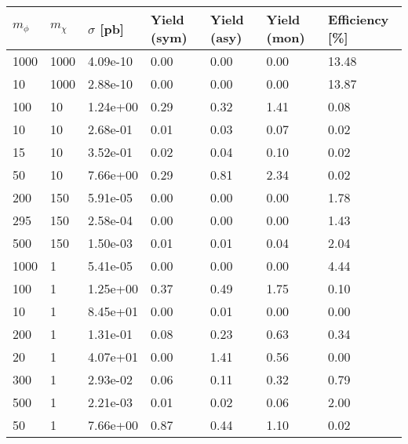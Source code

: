 \begin{table}
\small
\centering
\begin{tabular}{lllllll}
\hline
$m_\phi$ & $m_\chi$ & $\sigma$ [pb] & Yield (sym) & Yield (asy) & Yield (mon) & Efficiency [\%] \\ \hline
1000      &   1000      &   4.09e-10  &   0.00      &   0.00      &   0.00      &   13.48     \\ 
10        &   1000      &   2.88e-10  &   0.00      &   0.00      &   0.00      &   13.87     \\ 
100       &   10        &   1.24e+00  &   0.29      &   0.32      &   1.41      &   0.08      \\ 
10        &   10        &   2.68e-01  &   0.01      &   0.03      &   0.07      &   0.02      \\ 
15        &   10        &   3.52e-01  &   0.02      &   0.04      &   0.10      &   0.02      \\ 
50        &   10        &   7.66e+00  &   0.29      &   0.81      &   2.34      &   0.02      \\ 
200       &   150       &   5.91e-05  &   0.00      &   0.00      &   0.00      &   1.78      \\ 
295       &   150       &   2.58e-04  &   0.00      &   0.00      &   0.00      &   1.43      \\ 
500       &   150       &   1.50e-03  &   0.01      &   0.01      &   0.04      &   2.04      \\ 
1000      &   1         &   5.41e-05  &   0.00      &   0.00      &   0.00      &   4.44      \\ 
100       &   1         &   1.25e+00  &   0.37      &   0.49      &   1.75      &   0.10      \\ 
10        &   1         &   8.45e+01  &   0.00      &   0.01      &   0.00      &   0.00      \\ 
200       &   1         &   1.31e-01  &   0.08      &   0.23      &   0.63      &   0.34      \\ 
20        &   1         &   4.07e+01  &   0.00      &   1.41      &   0.56      &   0.00      \\ 
300       &   1         &   2.93e-02  &   0.06      &   0.11      &   0.32      &   0.79      \\ 
500       &   1         &   2.21e-03  &   0.01      &   0.02      &   0.06      &   2.00      \\ 
50        &   1         &   7.66e+00  &   0.87      &   0.44      &   1.10      &   0.02      \\ 

\end{tabular}
\end{table}
